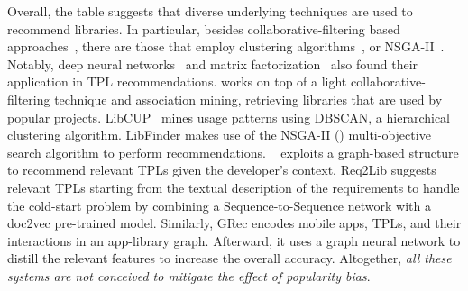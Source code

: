 Overall, the table suggests that diverse underlying techniques are used to recommend libraries. In particular, besides collaborative-filtering based approaches~\cite{NGUYEN2019110460,6671293}, there are those that employ clustering algorithms~\cite{SAIED2018164}, %
or NSGA-II~\cite{Ouni:2017:SSL:3032135.3032325}. Notably, deep neural networks~\cite{9043686,10.1145/3468264.3468552,9054865} and matrix factorization~\cite{9043686} also found their application in TPL recommendations. \LR works on top of a light collaborative-filtering technique and association mining, retrieving libraries that are used by popular projects. LibCUP~\cite{SAIED2018164} mines usage patterns using DBSCAN, a hierarchical clustering algorithm. LibFinder \cite{Ouni:2017:SSL:3032135.3032325} makes use of the NSGA-II () multi-objective search algorithm to perform recommendations. \CR~\cite{NGUYEN2019110460} exploits a graph-based structure to recommend relevant TPLs given the developer's context. %
Req2Lib \cite{9054865} suggests relevant TPLs starting from the textual description of the requirements to handle the cold-start problem by combining a Sequence-to-Sequence network with a doc2vec pre-trained model. %
Similarly, GRec \cite{10.1145/3468264.3468552} encodes mobile apps, TPLs, and their interactions in an app-library graph. Afterward, it uses a graph neural network to distill the relevant features to increase the overall accuracy. Altogether, \emph{all these systems are not conceived to mitigate the effect of popularity bias}. %


